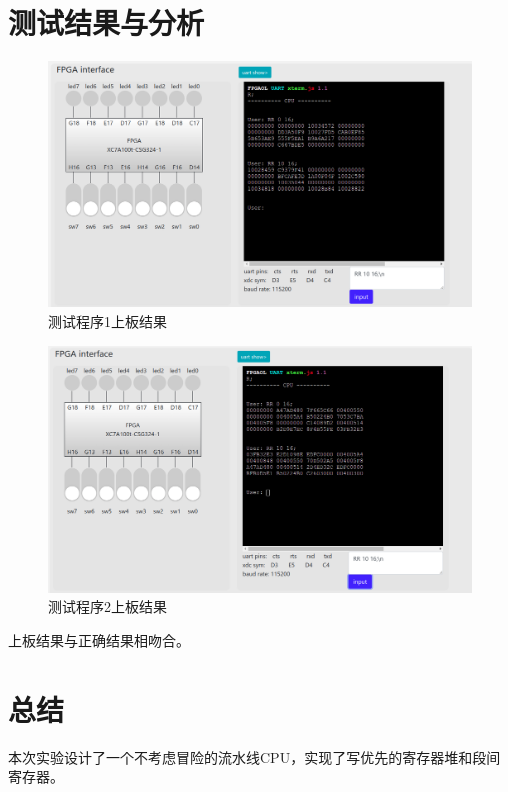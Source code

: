 \documentclass[12pt,a4paper]{ctexart}
\begin{document}
\section{测试结果与分析}
\begin{figure}[H]
    \centering
    \includegraphics[scale=0.5]{pic/上板1.png}
    \caption{测试程序1上板结果}
\end{figure}
\begin{figure}[H]
    \centering
    \includegraphics[scale=0.5]{pic/上板2.png}
    \caption{测试程序2上板结果}
\end{figure}
上板结果与正确结果相吻合。
\section{总结}
本次实验设计了一个不考虑冒险的流水线CPU，实现了写优先的寄存器堆和段间寄存器。
\end{document}
